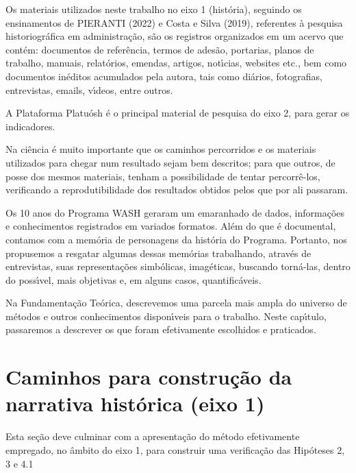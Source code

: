 \documentclass[
12pt,		%
openright,	%
twoside,  %
a4paper,			%
chapter=TITLE,		%
english,			%
french,				%
spanish,			%
brazil				%
]{USPSC-classe/USPSC}
\begin{document}
Os materiais utilizados neste trabalho no eixo 1 (hist\'oria), seguindo os ensinamentos de  PIERANTI (2022) e  Costa e Silva (2019), referentes \`a pesquisa historiogr\'afica em administra\c{c}\~ao,  s\~ao os registros organizados em um acervo que cont\'em: documentos de refer\^encia, termos de ades\~ao, portarias, planos de trabalho, manuais, relat\'orios, emendas, artigos, not\'{\i}cias, websites etc., bem como documentos in\'editos acumulados pela autora, tais como di\'arios, fotografias, entrevistas, emails, v\'{\i}deos, entre outros.








A Plataforma Platu\'osh \'e o principal material de pesquisa do eixo 2, para gerar os indicadores.








Na ci\^encia \'e muito importante que os caminhos percorridos e os materiais utilizados para chegar num resultado sejam bem descritos; para que outros, de posse dos mesmos materiais, tenham a possibilidade de tentar percorr\^e-los, verificando a reprodutibilidade dos resultados obtidos pelos que por ali passaram.








Os 10 anos do Programa WASH geraram um emaranhado de dados, informa\c{c}\~oes e conhecimentos registrados em variados formatos. Al\'em do que \'e documental, contamos com a mem\'oria de personagens da hist\'oria do Programa. Portanto, nos propusemos a resgatar algumas dessas mem\'orias trabalhando, atrav\'es de entrevistas, suas representa\c{c}\~oes simb\'olicas, imag\'eticas, buscando torn\'a-las, dentro do poss\'{\i}vel, mais objetivas e, em alguns casos, quantific\'aveis.








Na Fundamenta\c{c}\~ao Te\'orica, descrevemos uma parcela mais ampla do universo de m\'etodos e outros conhecimentos dispon\'{\i}veis para o trabalho. Neste cap\'{\i}tulo, passaremos a descrever os que foram efetivamente escolhidos e praticados.








\section[Caminhos para constru\c{c}\~ao da narrativa hist\'orica (eixo 1)]{Caminhos para constru\c{c}\~ao da narrativa hist\'orica (eixo 1)}\label{Caminhos para constru\c{c}\~ao da narrativa hist\'orica (eixo 1)}
Esta se\c{c}\~ao deve culminar com a apresenta\c{c}\~ao do m\'etodo efetivamente empregado, no \^ambito do eixo 1, para construir uma verifica\c{c}\~ao das Hip\'oteses 2, 3 e 4.1
\end{document}
